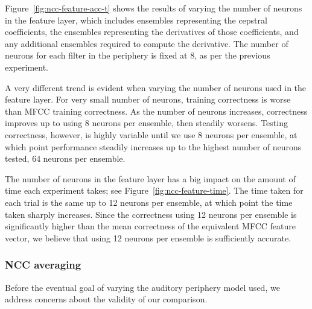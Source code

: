 
Figure~\ref{fig:ncc-feature-acc-t} shows the results
of varying the number of neurons
in the feature layer,
which includes ensembles
representing the cepstral coefficients,
the ensembles representing
the derivatives of those coefficients,
and any additional ensembles required
to compute the derivative.
The number of neurons for each filter
in the periphery is fixed at 8,
as per the previous experiment.

A very different trend is evident
when varying the number of neurons
used in the feature layer.
For very small number of neurons,
training correctness is worse
than MFCC training correctness.
As the number of neurons increases,
correctness improves up to
using 8 neurons per ensemble,
then steadily worsens.
Testing correctness, however,
is highly variable until
we use 8 neurons per ensemble,
at which point performance
steadily increases up to
the highest number of neurons tested,
64 neurons per ensemble.


The number of neurons in the feature layer
has a big impact on the amount of time
each experiment takes;
see Figure~\ref{fig:ncc-feature-time}.
The time taken for each trial
is the same up to 12 neurons per ensemble,
at which point
the time taken sharply increases.
Since the correctness using 12 neurons per ensemble
is significantly higher than
the mean correctness of the equivalent MFCC feature vector,
we believe that using 12 neurons per ensemble
is sufficiently accurate.

\subsubsection{NCC averaging}

Before the eventual goal of
varying the auditory periphery model used,
we address concerns about the validity
of our comparison.

